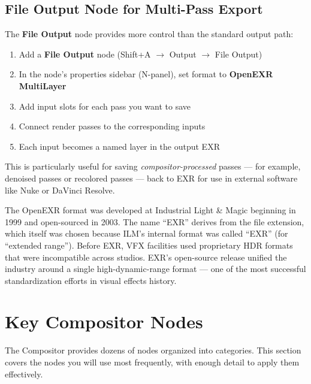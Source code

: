 \subsection{File Output Node for Multi-Pass Export}

The \textbf{File Output} node provides more control than the standard output path:

\begin{enumerate}[leftmargin=2em]
  \item Add a \textbf{File Output} node (Shift+A $\rightarrow$ Output $\rightarrow$ File Output)
  \item In the node's properties sidebar (N-panel), set format to \textbf{OpenEXR MultiLayer}
  \item Add input slots for each pass you want to save
  \item Connect render passes to the corresponding inputs
  \item Each input becomes a named layer in the output EXR
\end{enumerate}

This is particularly useful for saving \textit{compositor-processed} passes --- for example, denoised passes or recolored passes --- back to EXR for use in external software like Nuke or DaVinci Resolve.

\begin{historynote}
The OpenEXR format was developed at Industrial Light \& Magic beginning in 1999 and open-sourced in 2003. The name ``EXR'' derives from the file extension, which itself was chosen because ILM's internal format was called ``EXR'' (for ``extended range''). Before EXR, VFX facilities used proprietary HDR formats that were incompatible across studios. EXR's open-source release unified the industry around a single high-dynamic-range format --- one of the most successful standardization efforts in visual effects history.
\end{historynote}

\section{Key Compositor Nodes}
\label{sec:compositor-nodes}

The Compositor provides dozens of nodes organized into categories. This section covers the nodes you will use most frequently, with enough detail to apply them effectively.

